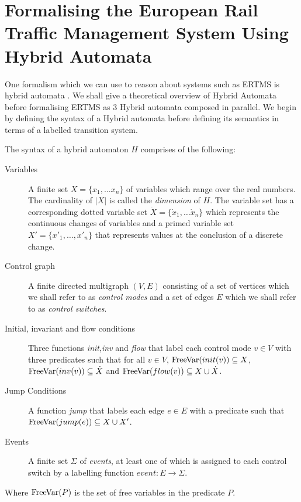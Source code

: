 \section{Formalising the European Rail Traffic Management System Using Hybrid Automata}
One formalism which we can use to reason about systems such as ERTMS is hybrid automata \cite{TH96}. We shall give a theoretical overview of Hybrid Automata before formalising ERTMS as 3 Hybrid automata composed in parallel.
We begin by defining the syntax of a Hybrid automata before defining its semantics in terms of a labelled transition system.
\medskip
\begin{mydef}
The syntax of a hybrid automaton $H$ comprises of the following:
\begin{description}
\item[Variables] A finite set $X = \{x_1, \ldots x_n \}$ of variables which range over the real numbers. The cardinality of $|X|$ is called the \emph{dimension} of $H$. The variable set has a corresponding dotted variable set $\dot{X} = \{\dot{x}_1, \ldots \dot{x}_n \}$ which represents the continuous changes of variables and a primed variable set $X' = \{x'_1, \ldots , x'_n \}$ that represents  values at the conclusion of a discrete change.

\item[Control graph] A finite directed multigraph $(V,E)$ consisting of a set of vertices which we shall refer to as \emph{control modes} and a set of edges $E$ which we shall refer to as \emph{control switches}.

\item[Initial, invariant and flow conditions] Three functions \emph{init},\emph{inv} and \emph{flow} that label each control mode $v \in V$ with three predicates such that for all $v \in V$, $\mathrm{FreeVar}(init(v)) \subseteq X$, $\mathrm{FreeVar}(inv(v)) \subseteq \dot{X}$ and $\mathrm{FreeVar}(flow(v)) \subseteq X \cup \dot{X}$. 


\item[Jump Conditions] A function \emph{jump} that labels each edge $e \in E$ with a predicate such that $\mathrm{FreeVar}(jump(e)) \subseteq X \cup X' $.

\item[Events] A finite set $\Sigma$ of \emph{events}, at least one of which is assigned to  each control switch by a labelling function $event: E \to \Sigma$.

\end{description}
Where $\mathrm{FreeVar}(P)$ is the set of free variables in the predicate $P$.
\end{mydef}
